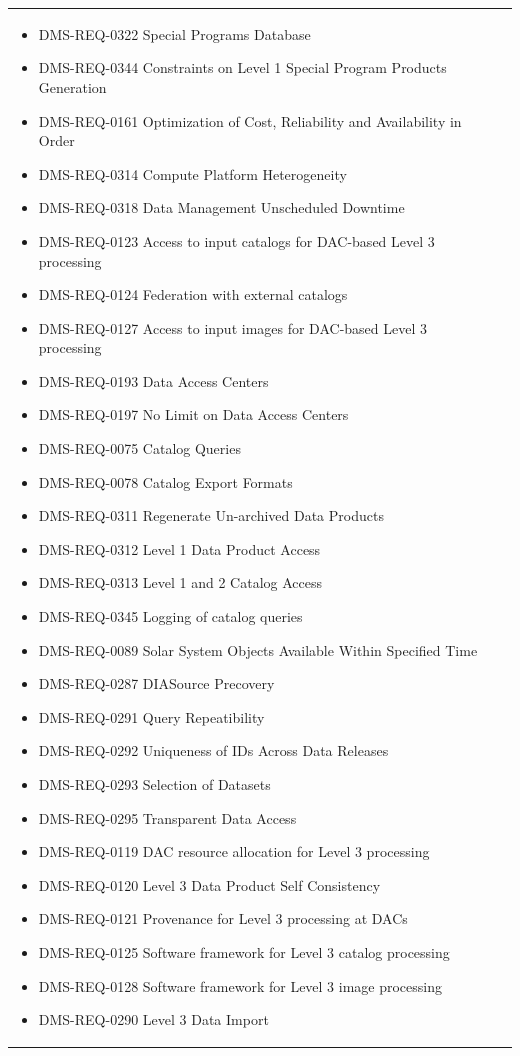 \documentclass[DM,lsstdraft,toc]{lsstdoc}
\begin{document}
\begin{xtabular}{|p{0.1\textwidth}|p{0.85\textwidth}|}
\begin{itemize}
\item DMS-REQ-0322 Special Programs Database
\item DMS-REQ-0344 Constraints on Level 1 Special Program Products Generation
\item DMS-REQ-0161 Optimization of Cost, Reliability and Availability in Order
\item DMS-REQ-0314 Compute Platform Heterogeneity
\item DMS-REQ-0318 Data Management Unscheduled Downtime
\item DMS-REQ-0123 Access to input catalogs for DAC-based Level 3 processing
\item DMS-REQ-0124 Federation with external catalogs
\item DMS-REQ-0127 Access to input images for DAC-based Level 3 processing
\item DMS-REQ-0193 Data Access Centers
\item DMS-REQ-0197 No Limit on Data Access Centers
\item DMS-REQ-0075 Catalog Queries
\item DMS-REQ-0078 Catalog Export Formats
\item DMS-REQ-0311 Regenerate Un-archived Data Products
\item DMS-REQ-0312 Level 1 Data Product Access
\item DMS-REQ-0313 Level 1 and 2 Catalog Access
\item DMS-REQ-0345 Logging of catalog queries
\item DMS-REQ-0089 Solar System Objects Available Within Specified Time
\item DMS-REQ-0287 DIASource Precovery
\item DMS-REQ-0291 Query Repeatibility
\item DMS-REQ-0292 Uniqueness of IDs Across Data Releases
\item DMS-REQ-0293 Selection of Datasets
\item DMS-REQ-0295 Transparent Data Access
\item DMS-REQ-0119 DAC resource allocation for Level 3 processing
\item DMS-REQ-0120 Level 3 Data Product Self Consistency
\item DMS-REQ-0121 Provenance for Level 3 processing at DACs
\item DMS-REQ-0125 Software framework for Level 3 catalog processing
\item DMS-REQ-0128 Software framework for Level 3 image processing
\item DMS-REQ-0290 Level 3 Data Import

\end{itemize}
\end{xtabular}
\end{document}
